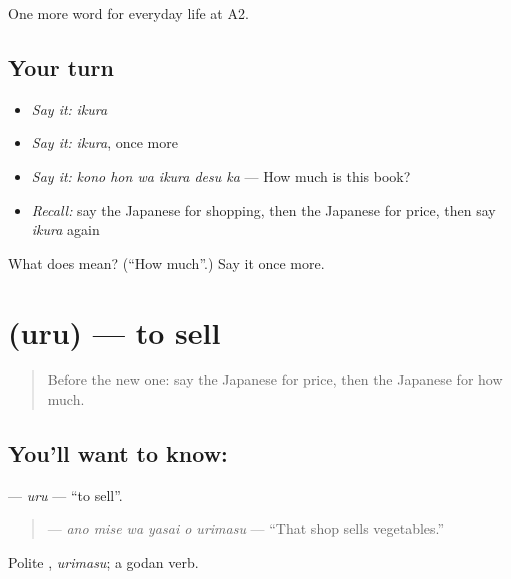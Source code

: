 \begin{grammarlens}[title={What you've built}]
One more word for everyday life at A2.
\end{grammarlens}

\subsection*{Your turn}
\begin{itemize}
\raggedright
  \item \emph{Say it:} \emph{ikura}
  \item \emph{Say it:} \emph{ikura}, once more
  \item \emph{Say it:} \emph{kono hon wa ikura desu ka} — How much is this book?
  \item \emph{Recall:} say the Japanese for shopping, then the Japanese for price, then say \emph{ikura} again
\end{itemize}

\begin{tcolorbox}[breakable,colback=teal!4,colframe=teal!35!black,title={Before you move on}]
What does  mean? (\textquotedblleft{}How much\textquotedblright{}.) Say it once more.
\end{tcolorbox}
\section[\texorpdfstring{\ja{うる} (uru)}{うる (uru)}]{ (uru) — to sell}

\label{lesson:JA-C181-uru}



\begin{quote}
Before the new one: say the Japanese for price, then the Japanese for how much.
\end{quote}

\subsection*{You'll want to know: }
\textbf{} — \emph{uru} — \textquotedblleft{}to sell\textquotedblright{}.

\begin{quote}
\textbf{   } — \emph{ano mise wa yasai o urimasu} — \textquotedblleft{}That shop sells vegetables.\textquotedblright{}
\end{quote}

Polite \textbf{}, \emph{urimasu}; a godan verb.

